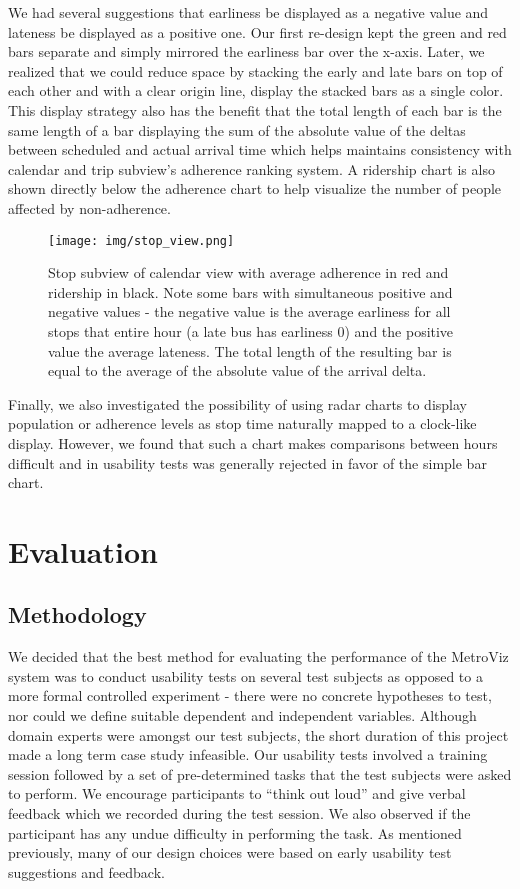 \documentclass[journal]{vgtc}
\begin{document}
We had several suggestions that earliness be displayed as a negative value and lateness be displayed as a positive one. Our first re-design kept the green and red bars separate and simply mirrored the earliness bar over the x-axis. Later, we realized that we could reduce space by stacking the early and late bars on top of each other and with a clear origin line, display the stacked bars as a single color. This display strategy also has the benefit that the total length of each bar is the same length of a bar displaying the sum of the absolute value of the deltas between scheduled and actual arrival time which helps maintains consistency with calendar and trip subview's adherence ranking system. A ridership chart is also shown directly below the adherence chart to help visualize the number of people affected by non-adherence.

\begin{figure}[htb]
 \centering
 \texttt{[image: img/stop\_view.png]}
 \caption{Stop subview of calendar view with average adherence in red and ridership in black. Note some bars with simultaneous positive and negative values - the negative value is the average earliness for all stops that entire hour (a late bus has earliness 0) and the positive value the average lateness. The total length of the resulting bar is equal to the average of the absolute value of the arrival delta.}
 \label{stop_component}
\end{figure}

Finally, we also investigated the possibility of using radar charts to display population or adherence levels as stop time naturally mapped to a clock-like display. However, we found that such a chart makes comparisons between hours difficult and in usability tests was generally rejected in favor of the simple bar chart.

\section{Evaluation}
\subsection{Methodology}
We decided that the best method for evaluating the performance of the MetroViz system was to conduct usability tests on several test subjects as opposed to a more formal controlled experiment - there were no concrete hypotheses to test, nor could we define suitable dependent and independent variables. Although domain experts were amongst our test subjects, the short duration of this project made a long term case study infeasible. Our usability tests involved a training session followed by a set of pre-determined tasks that the test subjects were asked to perform. We encourage participants to ``think out loud'' and give verbal feedback which we recorded during the test session. We also observed if the participant has any undue difficulty in performing the task. As mentioned previously, many of our design choices were based on early usability test suggestions and feedback.
\end{document}
